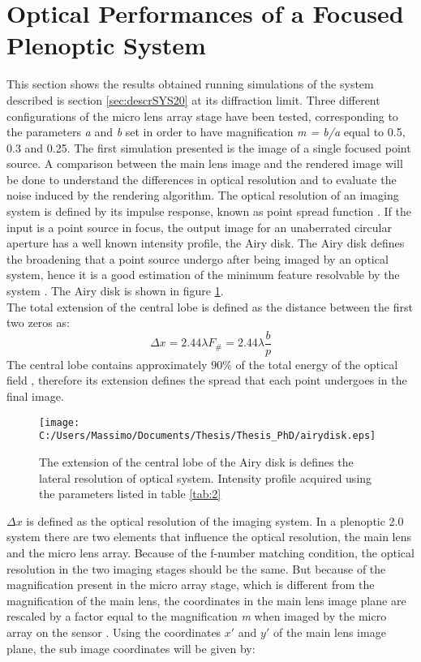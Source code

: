 \section{Optical Performances of a Focused Plenoptic System}
\label{sec:performances}
This section shows the results obtained running simulations of the system described is section \ref{sec:descrSYS20} at its diffraction limit. Three different configurations of the micro lens array stage have been tested, corresponding to the parameters \textit{a} and \textit{b} set in order to have magnification \textit{m = b/a} equal to 0.5, 0.3 and 0.25.
The first simulation presented is the image of a single focused point source. A comparison between the main lens image and the rendered image will be done to understand the differences in optical resolution and to evaluate the noise induced by the rendering algorithm.
The optical resolution of an imaging system is defined by its impulse response, known as point spread function \cite{goodman2005introduction,pedrotti1993introduction}. If the input is a point source in focus, the output image for an unaberrated circular aperture has a well known intensity profile, the Airy disk. The Airy disk defines the broadening that a point source undergo after being imaged by an optical system, hence it is a good estimation of the minimum feature resolvable by the system \cite{goodman2005introduction,herzig1997micro}. The Airy disk is shown in figure \ref{fig:airydisk}.  \\
The total extension of the central lobe is defined as the distance between the first two zeros as:
\begin{equation}
	\label{eq:airy3}
	\Delta x = 2.44 \lambda F_\# = 2.44 \lambda \dfrac{b}{p}
\end{equation}
The central lobe contains approximately $90 \%$ of the total energy of the optical field \cite{goodman2005introduction}, therefore its extension defines the spread that each point undergoes in the final image. 
\begin{figure}[H]
	\centering
	\texttt{[image: C:/Users/Massimo/Documents/Thesis/Thesis\_PhD/airydisk.eps]}
	\caption{\label{fig:airydisk} The extension of the central lobe of the Airy disk is defines the lateral resolution of optical system. Intensity profile acquired using the parameters listed in table \ref{tab:2}}
\end{figure}
$\Delta x$ is defined as the optical resolution of the imaging system.
In a plenoptic 2.0 system there are two elements that influence the optical resolution, the main lens and the micro lens array. Because of the f-number matching condition, the optical resolution in the two imaging stages should be the same. But because of the magnification present in the micro array stage, which is different from the magnification of the main lens, the coordinates in the main lens image plane are rescaled by a factor equal to the magnification \textit{m} when imaged by the micro array on the sensor \cite{goodman2005introduction}. Using the coordinates $x'$ and $y'$ of the main lens image plane, the sub image coordinates will be given by:
